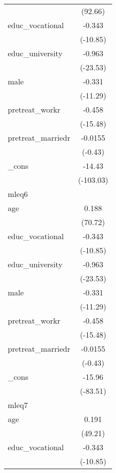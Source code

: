{\begin{tabular}{l*{1}{c}}
            &     (92.66)         \\
[1em]
educ\_vocational&      -0.343\sym{***}\\
            &    (-10.85)         \\
[1em]
educ\_university&      -0.963\sym{***}\\
            &    (-23.53)         \\
[1em]
male        &      -0.331\sym{***}\\
            &    (-11.29)         \\
[1em]
pretreat\_workr&      -0.458\sym{***}\\
            &    (-15.48)         \\
[1em]
pretreat\_marriedr&     -0.0155         \\
            &     (-0.43)         \\
[1em]
\_cons      &      -14.43\sym{***}\\
            &   (-103.03)         \\
\hline
mleq6       &                     \\
age         &       0.188\sym{***}\\
            &     (70.72)         \\
[1em]
educ\_vocational&      -0.343\sym{***}\\
            &    (-10.85)         \\
[1em]
educ\_university&      -0.963\sym{***}\\
            &    (-23.53)         \\
[1em]
male        &      -0.331\sym{***}\\
            &    (-11.29)         \\
[1em]
pretreat\_workr&      -0.458\sym{***}\\
            &    (-15.48)         \\
[1em]
pretreat\_marriedr&     -0.0155         \\
            &     (-0.43)         \\
[1em]
\_cons      &      -15.96\sym{***}\\
            &    (-83.51)         \\
\hline
mleq7       &                     \\
age         &       0.191\sym{***}\\
            &     (49.21)         \\
[1em]
educ\_vocational&      -0.343\sym{***}\\
            &    (-10.85)         \\

\end{tabular}}

